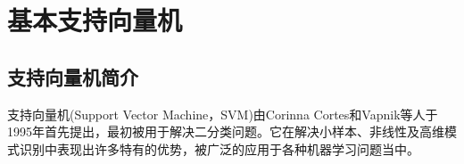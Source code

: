 % 

\chapter{基本支持向量机}
\section{支持向量机简介}
	支持向量机(Support Vector Machine，SVM)由Corinna Cortes和Vapnik等人于1995年首先提出，最初被用于解决二分类问题。它在解决小样本、非线性及高维模式识别中表现出许多特有的优势，被广泛的应用于各种机器学习问题当中。

